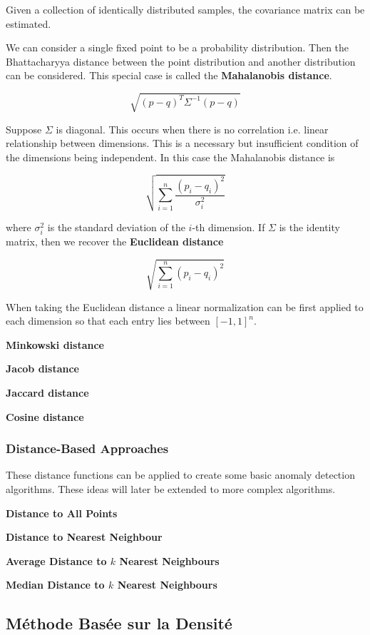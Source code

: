 Given a collection of identically distributed samples, the covariance matrix can be estimated.

We can consider a single fixed point to be a probability distribution.
Then the Bhattacharyya distance between the point distribution and another distribution can be considered.
This special case is called the \textbf{Mahalanobis distance}.

\[
\sqrt{(p - q)^T \Sigma^{-1} (p - q)}
\]

Suppose $\Sigma$ is diagonal.
This occurs when there is no correlation i.e. linear relationship between dimensions.
This is a necessary but insufficient condition of the dimensions being independent.
In this case the Mahalanobis distance is

\[
\sqrt{\sum_{i=1}^n \frac{(p_i - q_i)^2}{\sigma_i^2}}
\]

where $\sigma_i^2$ is the standard deviation of the $i$-th dimension.
If $\Sigma$ is the identity matrix, then we recover the \textbf{Euclidean distance}

\[
\sqrt{\sum_{i=1}^n (p_i - q_i)^2}
\]

When taking the Euclidean distance a linear normalization can be first applied to each dimension so that each entry lies between $[-1,1]^n$.


\textbf{Minkowski distance}

\textbf{Jacob distance}

\textbf{Jaccard distance}

\textbf{Cosine distance}

\subsubsection*{Distance-Based Approaches}

These distance functions can be applied to create some basic anomaly detection algorithms.
These ideas will later be extended to more complex algorithms.

\textbf{Distance to All Points}

\textbf{Distance to Nearest Neighbour}

\textbf{Average Distance to $k$ Nearest Neighbours}

\textbf{Median Distance to $k$ Nearest Neighbours}

\subsection{Méthode Basée sur la Densité}

